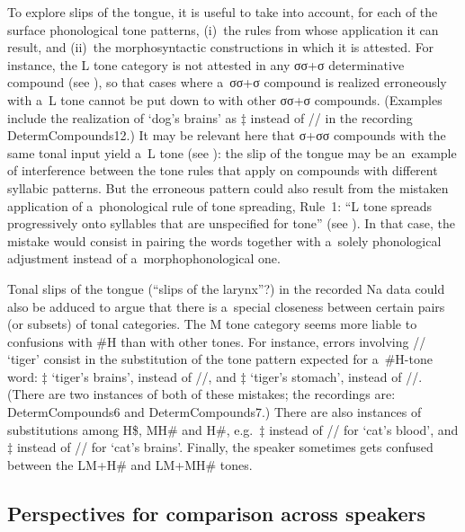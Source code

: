 To explore slips of
the tongue, it is useful to take into account, for each of the surface phonological tone patterns, (i)~the rules from whose application it can result, and (ii)~the morphosyntactic constructions in which it is attested. For instance, the L tone category is not attested in any σσ+σ determinative compound (see ), so that cases where a~σσ+σ compound is realized erroneously with a~L tone cannot be put down to  with other σσ+σ compounds. (Examples include the realization of ‘dog’s brains’ as $\ddagger${\kern2pt} instead of
// in the recording DetermCompounds12.) It may be relevant here that σ+σσ compounds with the same tonal input yield a~L tone (see ): the slip of the tongue may be an~example of interference between the tone rules that apply on compounds with different syllabic patterns. But the erroneous pattern could also result from the mistaken application of a~{phonological rule} of tone spreading, Rule~1: “L tone spreads progressively onto syllables that are unspecified for tone” (see ). In that case, the mistake would consist in pairing the words together with a~solely phonological adjustment instead of a~morphophonological one.

Tonal slips of the tongue (“slips of the larynx”?) in the recorded Na data could also be adduced to argue that there is a~special closeness between certain pairs (or subsets) of tonal categories. The M tone category seems more liable to confusions
with \#H than with other tones. For instance, errors involving // ‘tiger’ consist in the
substitution of the tone pattern expected for a~\#H-tone word: $\ddagger${\kern2pt} ‘tiger’s brains’,
instead of //, and $\ddagger${\kern2pt} ‘tiger’s stomach’, instead of
//. (There are two instances of both of these mistakes; the recordings are: DetermCompounds6
and DetermCompounds7.) There are also instances of substitutions among H\$, MH\# and H\#, e.g.~$\ddagger${\kern2pt}
instead of // for ‘cat’s blood’, and $\ddagger${\kern2pt} instead of
// for ‘cat’s brains’. Finally, the speaker sometimes gets confused between the LM+H\# and
LM+MH\# tones.



\subsection{Perspectives for comparison across speakers}
\label{sec:crossspeakerdifferences}
\largerpage

